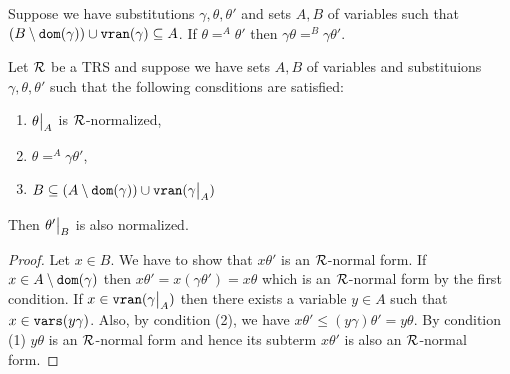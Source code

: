 \begin{proposition}\label{proposition:change-of-domain}
	Suppose we have substitutions $\gamma, \theta, \theta'$ and sets $A,B$ of variables such that $(B \setminus \mathtt{dom}(\gamma)) \cup \mathtt{v}\mathtt{ran}(\gamma) \subseteq A$. If $\theta =^{A} \theta'$ then $\gamma\theta =^{B} \gamma\theta'$.
\end{proposition}

\begin{proposition}\label{proposition:change-of-domain-normalized}
	Let $\mathcal{R}$ be a TRS and suppose we have sets $A,B$ of variables and substituions $\gamma, \theta, \theta'$ such that the following consditions are satisfied:
	\begin{enumerate}
		\item $\restr{\theta}{A}$ is $\mathcal{R}$-normalized,
		\item $\theta =^A \gamma \theta'$,
		\item $B \subseteq (A \setminus \dom{\gamma}) \cup \vran{\restr{\gamma}{A}}$
	\end{enumerate}
	Then $\restr{\theta'}{B}$ is also normalized.
	\begin{proof}
		Let $x \in B$. We have to show that $x\theta'$ is an $\mathcal{R}$-normal form. If $x \in A \setminus \mathtt{dom}(\gamma)$ then $x\theta' = x(\gamma\theta') = x\theta$ which is an $\mathcal{R}$-normal form by the first condition. If $x \in \vran{\restr{\gamma}{A}}$ then there exists a variable $y \in A$ such that $x \in \mathtt{vars}(y\gamma)$. Also, by condition (2), we have $x\theta' \leq (y\gamma)\theta' = y\theta$. By condition (1) $y\theta$ is an $\mathcal{R}$-normal form and hence its subterm $x\theta'$ is also an $\mathcal{R}$-normal form.
	\end{proof}
\end{proposition}


